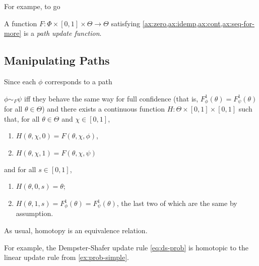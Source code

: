 For exampe, to go 

\begin{defn}
	A function $F: \Phi \times [0,1] \times \Theta \to \Theta$ 
	satisfying \cref{ax:zero,ax:idemp,ax:cont,ax:seq-for-more} is 
	a \emph{path update function}.
\end{defn}



\subsection{Manipulating Paths}
Since each $\phi$ corresponds to a path

\begin{defn}
	$\phi \sim_F \psi$  iff 
	they behave the same way for full confidence (that is, 
	$F^1_{\phi}(\theta) = F^1_{\psi}(\theta)$ for all $\theta \in \Theta$)
	and  there exists a continuous function
	$H : \Theta \times [0,1] \times [0,1]$ such that,
	for all $\theta \in \Theta$ and $\chi \in [0,1]$,
	\begin{enumerate}[nosep]
		\item $H(\theta, \chi, 0)= F(\theta, \chi, \phi)$,
		\item $H(\theta, \chi, 1)= F(\theta, \chi, \psi)$
	\end{enumerate}
	and for all $s \in [0,1]$,
	\begin{enumerate}
		\item $H(\theta, 0, s) = \theta$;
		\item $H(\theta, 1, s) = F^1_{\phi}(\theta) = F^1_{\psi}(\theta)$,
		the last two of	which are the same by assumption. \qedhere
	\end{enumerate}
\end{defn}

As usual, homotopy is an equivalence relation.

For example, the Dempster-Shafer update rule \eqref{eq:ds-prob} is homotopic 
to the linear update rule from \cref{ex:prob-simple}. 


